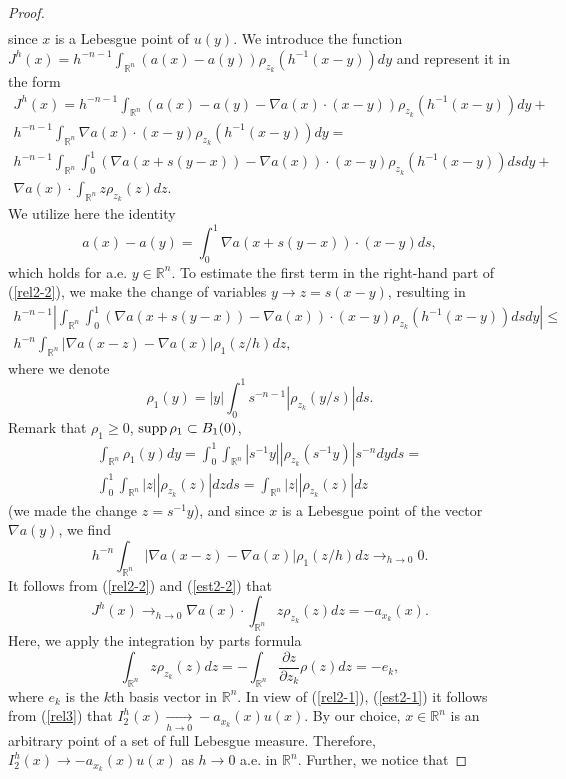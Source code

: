 \documentclass[12pt]{article}
\theoremstyle{plain}
\theoremstyle{definition}
\numberwithin{equation}{section}
\newcommand{\R}{{\mathbb R}}
\newcommand{\supp}{\mathop{\rm supp}}
\begin{document}
\begin{proof}
\begin{align}
\end{align}
since $x$ is a Lebesgue point of $u(y)$. We introduce the function ${\displaystyle J^h(x)=h^{-n-1}\int_{\R^n}(a(x)-a(y))\rho_{z_k}(h^{-1}(x-y))dy}$ and represent it in the form
\begin{align}\label{rel2-2}
J^h(x)=h^{-n-1}\int_{\R^n}(a(x)-a(y)-\nabla a(x)\cdot(x-y))\rho_{z_k}(h^{-1}(x-y))dy+\nonumber\\ h^{-n-1}\int_{\R^n}\nabla a(x)\cdot (x-y)\rho_{z_k}(h^{-1}(x-y))dy=\nonumber\\
h^{-n-1}\int_{\R^n}\int_0^1 (\nabla a(x+s(y-x))-\nabla a(x))\cdot(x-y)\rho_{z_k}(h^{-1}(x-y))dsdy+\nonumber\\ \nabla a(x)\cdot\int_{\R^n}z\rho_{z_k}(z)dz.
\end{align}
We utilize here the identity
\[
a(x)-a(y)=\int_0^1\nabla a(x+s(y-x))\cdot(x-y)ds,
\]
which holds for a.e. $y\in\R^n$.
To estimate the first term in the right-hand part of (\ref{rel2-2}), we make the change of variables $y\to z=s(x-y)$, resulting in
\begin{align}\label{est2-2}
h^{-n-1}\left|\int_{\R^n}\int_0^1 (\nabla a(x+s(y-x))-\nabla a(x))\cdot(x-y)\rho_{z_k}(h^{-1}(x-y))dsdy\right|\le\nonumber\\
h^{-n}\int_{\R^n} |\nabla a(x-z)-\nabla a(x)|\rho_1(z/h)dz,
\end{align}
where we denote
\[
\rho_1(y)=|y|\int_0^1s^{-n-1}|\rho_{z_k}(y/s)|ds.
\]
Remark that $\rho_1\ge 0$, $\supp\rho_1\subset B_1(0)$, 
\begin{align*}
\int_{\R^n}\rho_1(y)dy=\int_0^1\int_{\R^n} |s^{-1}y||\rho_{z_k}(s^{-1}y)|s^{-n}dyds= \\ \int_0^1\int_{\R^n}|z||\rho_{z_k}(z)|dz ds=\int_{\R^n}|z||\rho_{z_k}(z)|dz
\end{align*}
(we made the change $z=s^{-1}y$), and since $x$ is a Lebesgue point of the vector $\nabla a(y)$, we find
\[h^{-n}\int_{\R^n} |\nabla a(x-z)-\nabla a(x)|\rho_1(z/h)dz\mathop{\to}_{h\to 0} 0.\]
It follows from (\ref{rel2-2}) and (\ref{est2-2}) that
\begin{equation} \label{rel3}
J^h(x)\mathop{\to}_{h\to 0} \nabla a(x)\cdot\int_{\R^n}z\rho_{z_k}(z)dz=-a_{x_k}(x).
\end{equation}
Here, we apply the integration by parts formula
\[\int_{\R^n}z\rho_{z_k}(z)dz=-\int_{\R^n}\frac{\partial z}{\partial z_k}\rho(z)dz=-e_k, \]
where $e_k$ is the $k$th basis vector in $\R^n$.
In view of (\ref{rel2-1}), (\ref{est2-1}) it follows from (\ref{rel3}) that $I_2^h(x)\mathop{\to}\limits_{h\to 0} -a_{x_k}(x)u(x)$. By our choice, $x\in\R^n$ is an arbitrary point of a set of full Lebesgue measure. Therefore, $I_2^h(x)\to -a_{x_k}(x)u(x)$ as $h\to 0$ a.e. in $\R^n$. Further, we notice that

\end{proof}
\end{document}

